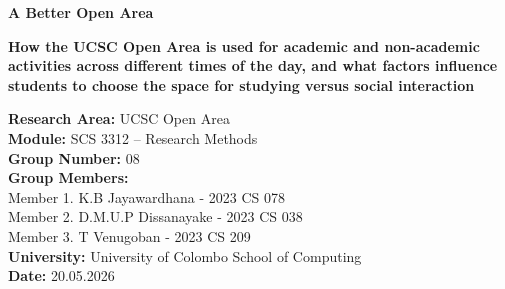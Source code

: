 \documentclass[12pt]{report}
\begin{document}
\begin{titlepage}
    \centering
    
    \vspace*{1.5cm}
    
    {\Huge \textbf{A Better Open Area}}\\[1.5cm]
    
    \vspace{2cm}
    
    {\Large
    \textbf{How the UCSC Open Area is used for academic and non-academic activities across different times of the day, and what factors influence students to choose the space for studying versus social interaction}
    }\\[2cm]
    
    \vfill
    
    \begin{flushleft}
    \textbf{Research Area:} UCSC Open Area\\[0.5cm]
    
    \textbf{Module:} SCS 3312 -- Research Methods\\[0.5cm]

    \textbf{Group Number:} 08\\[0.5cm]
    
    
    \textbf{Group Members:}\\
    Member 1. K.B Jayawardhana - 2023 CS 078\\
    Member 2. D.M.U.P Dissanayake - 2023 CS 038\\
    Member 3.  T Venugoban - 2023 CS 209\\[0.5cm]
    
    \textbf{University:} University of Colombo School of Computing\\[0.5cm]
    
    \textbf{Date:} 20.05.2026
    \end{flushleft}
    
\end{titlepage}


\tableofcontents
\newpage

\end{document}
